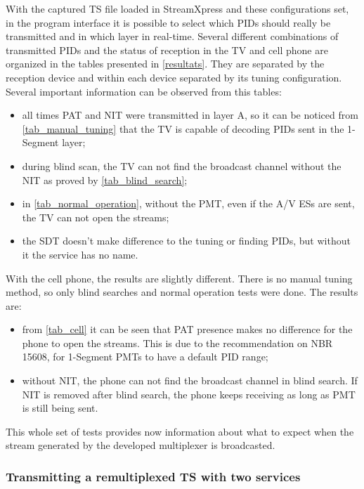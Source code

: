\documentclass[12pt,a4paper]{article}
\begin{document}
With the captured TS file loaded in StreamXpress and these configurations set, in the program interface it is possible to select which PIDs should really be transmitted and in which layer in real-time. Several different combinations of transmitted PIDs and the status of reception in the TV and cell phone are organized in the tables presented in \autoref{resultats}. They are separated by the reception device and within each device separated by its tuning configuration. Several important information can be observed from this tables:
\begin{itemize}
\item all times PAT and NIT were transmitted in layer A, so it can be noticed from \autoref{tab_manual_tuning} that the TV is capable of decoding PIDs sent in the 1-Segment layer;
\item during blind scan, the TV can not find the broadcast channel without the NIT as proved by \autoref{tab_blind_search};
\item in \autoref{tab_normal_operation}, without the PMT, even if the A/V ESs are sent, the TV can not open the streams;
\item the SDT doesn't make difference to the tuning or finding PIDs, but without it the service has no name.
\end{itemize}

With the cell phone, the results are slightly different. There is no manual tuning method, so only blind searches and normal operation tests were done. The results are:

\begin{itemize}
\item from \autoref{tab_cell} it can be seen that PAT presence makes no difference for the phone to open the streams. This is due to the recommendation on NBR 15608, for 1-Segment PMTs to have a default PID range;
\item without NIT, the phone can not find the broadcast channel in blind search. If NIT is removed after blind search, the phone keeps receiving as long as PMT is still being sent.
\end{itemize}

This whole set of tests provides now information about what to expect when the stream generated by the developed multiplexer is broadcasted.

\subsubsection{Transmitting a remultiplexed TS with two services}
\label{test_remultiplexing}
\end{document}
